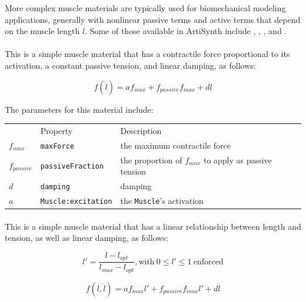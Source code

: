 More complex muscle materials are typically used for biomechanical
modeling applications, generally with nonlinear passive terms and
active terms that depend on the muscle length $l$.  Some of those
available in ArtiSynth include
,
,
, and
.

\paragraph{}
This is a simple muscle material that has a contractile force proportional to its activation, a constant passive tension, and linear damping, as follows:

\begin{equation}
f(\dot l) = a f_{max} +  f_{passive} f_{max} + d \dot l 
\label{ConstantAxialMaterial:eqn}
\end{equation}


The parameters for this material include:\\
\begin{tabular}{|l|l|l|} \hline
 & Property & Description \\
$f_{max}$ & {\tt maxForce} & the maximum contractile force \\
$f_{passive}$ & {\tt passiveFraction} & the proportion of $f_{max}$ to apply as passive tension \\
$d$ & {\tt damping} & damping \\ 
$a$ & {\tt Muscle:excitation} & the {\tt Muscle}'s activation \\ \hline
\end{tabular}


\paragraph{}
This is a simple muscle material that has a linear relationship between length and tension, as well as linear damping, as follows:

\begin{equation}
l' = \frac{l - l_{opt}}{l_{max} - l_{opt}}, \mathrm{with}~ 0 \le l' \le 1~\mathrm{enforced}
\end{equation}

\begin{equation}
f(l, \dot l) = a f_{max} l' +  f_{passive} f_{max} l' + d \dot l 
\label{LinearAxialMaterial:eqn}
\end{equation}

